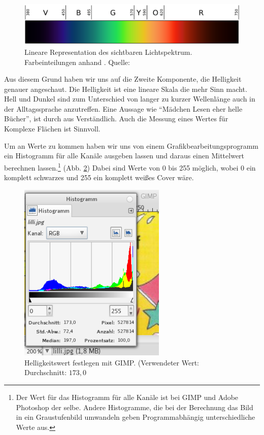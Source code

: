 \begin{figure}
\center
\includegraphics{grafiken/spectrum.png}
  \caption[Sichtbares Lichtspektrum]{Lineare Representation des sichtbaren Lichtspektrum. Farbeinteilungen anhand \cite[3]{Bruno2006}. Quelle: \cite[][\href{http://en.wikipe/wiki/File:Linear_visible_spectrum.svg}{\texttt{/wiki/File:Linear\_visible\_spectrum.svg}}]{en.wiki}}
  \label{spectrum}
\end{figure}

Aus diesem Grund haben wir uns auf die Zweite Komponente, die Helligkeit
genauer angeschaut. Die Helligkeit ist eine lineare Skala die mehr Sinn
macht. Hell und Dunkel sind zum Unterschied von langer zu kurzer
Wellenlänge auch in der Alltagssprache anzutreffen. Eine Aussage wie
\enquote{Mädchen Lesen eher helle Bücher}, ist durch aus Verständlich.
Auch die Messung eines Wertes für Komplexe Flächen ist Sinnvoll.

Um an Werte zu kommen haben wir uns von einem Grafikbearbeitungsprogramm
ein Histogramm für alle Kanäle ausgeben lassen und daraus einen
Mittelwert berechnen
lassen.\footnote{Der Wert für das Histogramm für alle Kanäle ist bei GIMP und Adobe Photoshop der selbe. Andere Histogramme, die bei der Berechnung das Bild in ein Graustufenbild umwandeln geben Programmabhängig unterschiedliche Werte aus.}
(Abb. \ref{histogramm}) Dabei sind Werte von 0 bis 255 möglich, wobei 0
ein komplett schwarzes und 255 ein komplett weißes Cover wäre.

\begin{figure}
\center
\includegraphics[width=7cm]{grafiken/hist.png}
  \caption[Helligkeitswert festlegen mit GIMP]{Helligkeitswert festlegen mit GIMP. (Verwendeter Wert: Durchschnitt: $173{,}0$}
  \label{histogramm}
\end{figure}

